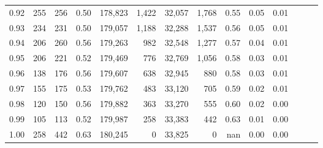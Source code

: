 \begin{tabular}{rrrrrrrrrrrrrr}
0.92 &    255 &  256 &  0.50 &  178,823 &    1,422 &  32,057 &   1,768 &  0.55 &  0.05 &      0.01 \\
0.93 &    234 &  231 &  0.50 &  179,057 &    1,188 &  32,288 &   1,537 &  0.56 &  0.05 &      0.01 \\
0.94 &    206 &  260 &  0.56 &  179,263 &      982 &  32,548 &   1,277 &  0.57 &  0.04 &      0.01 \\
0.95 &    206 &  221 &  0.52 &  179,469 &      776 &  32,769 &   1,056 &  0.58 &  0.03 &      0.01 \\
0.96 &    138 &  176 &  0.56 &  179,607 &      638 &  32,945 &     880 &  0.58 &  0.03 &      0.01 \\
0.97 &    155 &  175 &  0.53 &  179,762 &      483 &  33,120 &     705 &  0.59 &  0.02 &      0.01 \\
0.98 &    120 &  150 &  0.56 &  179,882 &      363 &  33,270 &     555 &  0.60 &  0.02 &      0.00 \\
0.99 &    105 &  113 &  0.52 &  179,987 &      258 &  33,383 &     442 &  0.63 &  0.01 &      0.00 \\
1.00 &    258 &  442 &  0.63 &  180,245 &        0 &  33,825 &       0 &   nan &  0.00 &      0.00 \\
\bottomrule
\end{tabular}
